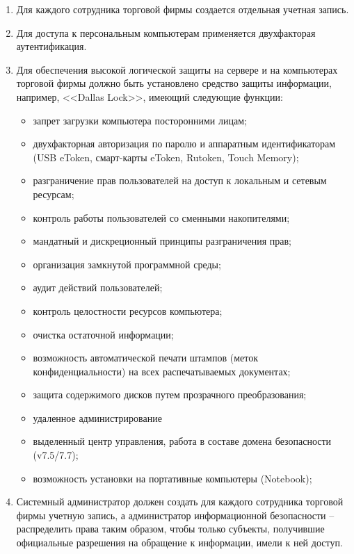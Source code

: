 \begin{enumerate}
	\item Для каждого сотрудника торговой фирмы создается отдельная учетная запись.
	\item Для доступа к персональным компьютерам применяется двухфакторая аутентификация.
	\item Для обеспечения высокой логической защиты на сервере и на компьютерах торговой фирмы должно быть установлено средство защиты информации, например, <<Dallas Lock>>, имеющий следующие функции:
	\begin{itemize}
		\item запрет загрузки компьютера посторонними лицам;
		\item 		двухфакторная авторизация по паролю и аппаратным идентификаторам (USB eToken, смарт-карты eToken, Rutoken, Touch Memory);
		\item 		разграничение прав пользователей на доступ к локальным и сетевым ресурсам;
		\item 		контроль работы пользователей со сменными накопителями;
		\item 		мандатный и дискреционный принципы разграничения прав;
		\item 		организация замкнутой программной среды;
		\item 		аудит действий пользователей;
		\item 		контроль целостности ресурсов компьютера;
		\item 		очистка остаточной информации;
		\item 		возможность автоматической печати штампов (меток конфиденциальности) на всех распечатываемых документах;
		\item 		защита содержимого дисков путем прозрачного преобразования;
		\item 		удаленное администрирование
		\item 		выделенный центр управления, работа в составе домена безопасности (v7.5/7.7);
		\item 		возможность установки на портативные компьютеры (Notebook);
	\end{itemize}
\item Системный администратор должен создать для каждого сотрудника торговой фирмы учетную запись, а администратор информационной безопасности  – распределить права таким образом, чтобы только субъекты, получившие официальные разрешения на обращение к информации, имели к ней доступ.
\end{enumerate}
